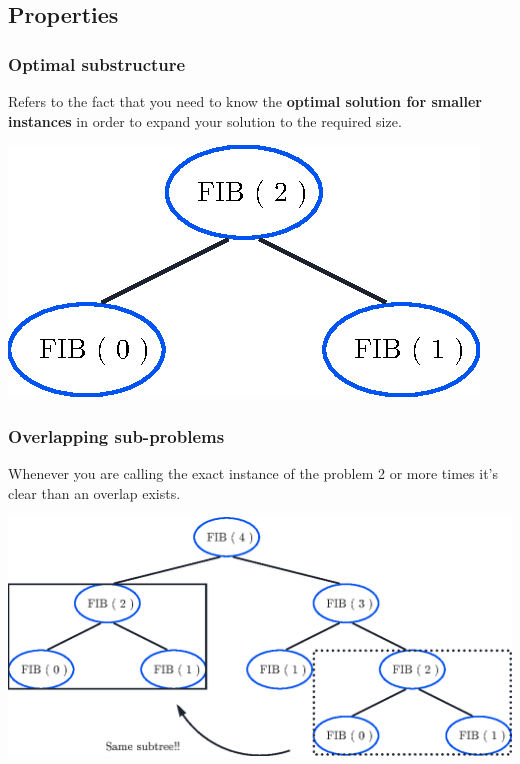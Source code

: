 \documentclass[article]{beamer}
\begin{document}
\subsection{Properties}
\begin{frame}
	\frametitle{Optimal substructure}
	Refers to the fact that you need to know the \textbf{optimal solution for smaller instances} in order to expand your solution to the required size.
	
	\vspace{8mm}
	
	\begin{center}
		\includegraphics[scale=0.8]{./figures/zoom.eps}
	\end{center}
\end{frame}

\begin{frame}
	\frametitle{Overlapping sub-problems}
	Whenever you are calling the exact instance of the problem 2 or more times it's clear than an overlap exists.
	
	\vspace{1mm}
	
	\begin{center}
		\includegraphics[scale=0.6]{./figures/overlaps.eps}
	\end{center}	
\end{frame}
\end{document}
